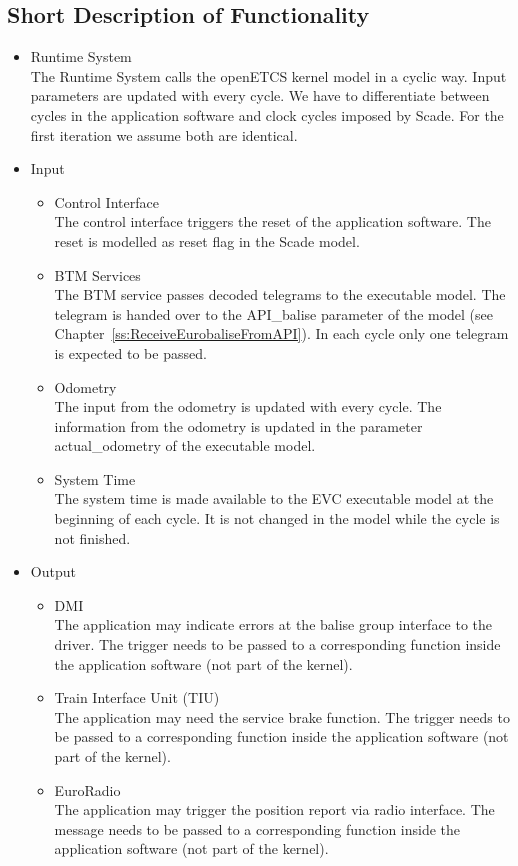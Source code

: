 \documentclass{template/openetcs_report}
\begin{document}
\subsection{Short Description of Functionality}

\begin{itemize}
\item Runtime System\\
The Runtime System calls the openETCS kernel model in a cyclic way. Input parameters are updated with every cycle. We have to differentiate between cycles in the application software and clock cycles imposed by Scade. For the first iteration we assume both are identical.
\item Input
\begin{itemize}
\item Control Interface\\
The control interface triggers the reset of the application software. The reset is modelled as reset flag in the Scade model.

\item BTM Services\\
The BTM service passes decoded telegrams to the executable model. The telegram is handed over to the API\_balise parameter of the model (see Chapter~\ref{ss:ReceiveEurobaliseFromAPI}). In each cycle only one telegram is expected to be passed.

\item Odometry\\
The input from the odometry is updated with every cycle. The information from the odometry is updated in the parameter actual\_odometry of the executable model.

\item System Time\\
The system time is made available to the EVC executable model at the beginning of each cycle. It is not changed in the model while the cycle is not finished.
\end{itemize}

\item Output
\begin{itemize}
\item DMI\\
The application may indicate errors at the balise group interface to the driver. The trigger needs to be passed to a corresponding function inside the application software (not part of the kernel).
\item Train Interface Unit (TIU)\\
The application may need the service brake function. The trigger needs to be passed to a corresponding function inside the application software (not part of the kernel).
\item EuroRadio\\
The application may trigger the position report via radio interface. The message needs to be passed to a corresponding function inside the application software (not part of the kernel).
\end{itemize}

\end{itemize}
\end{document}
